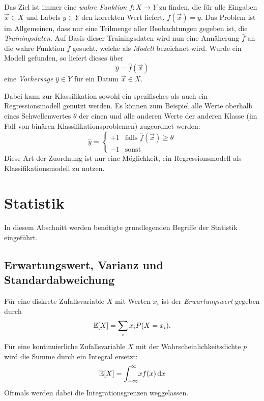 		Das Ziel ist immer eine \emph{wahre Funktion} \( f : X \to Y \) zu finden, die für alle Eingaben \( \vec{x} \in X \) und Labels \( y \in Y \) den korrekten Wert liefert, \dh \( f(\vec{x}) = y \). Das Problem ist im Allgemeinen, dass nur eine Teilmenge aller Beobachtungen gegeben ist, die \emph{Trainingsdaten}. Auf Basis dieser Trainingsdaten wird nun eine Annäherung \( \hat{f} \) an die wahre Funktion \(f\) gesucht, welche als \emph{Modell} bezeichnet wird. Wurde ein Modell gefunden, so liefert dieses über
		\begin{equation}
			\hat{y} = \hat{f}(\vec{x})
		\end{equation}
		eine \emph{Vorhersage} \( \hat{y} \in Y \) für ein Datum \( \vec{x} \in X \).

		Dabei kann zur Klassifikation sowohl ein spezifisches als auch ein Regressionsmodell genutzt werden. Es können zum Beispiel alle Werte oberhalb eines Schwellenwertes \(\theta\) der einen und alle anderen Werte der anderen Klasse (im Fall von binären Klassifikationsproblemen) zugeordnet werden:
		\begin{equation}
			\hat{y} =
				\begin{cases}
					+1 & \text{falls } \hat{f}(\vec{x}) \geq \theta \\
					-1 & \text{sonst}
				\end{cases}
		\end{equation}
		Diese Art der Zuordnung ist nur eine Möglichkeit, ein Regressionsmodell als Klassifikationsmodell zu nutzen.

	\section{Statistik}
		In diesem Abschnitt werden benötigte grundlegenden Begriffe der Statistik eingeführt.

		\subsection{Erwartungswert, Varianz und Standardabweichung}
			Für eine diskrete Zufallsvariable \(X\) mit Werten \( x_i \) ist der \emph{Erwartungswert} gegeben durch
			\begin{equation}
				\mathbb{E}[X] = \sum_i x_i P(X = x_i).
			\end{equation}
			Für eine kontinuierliche Zufallsvariable \(X\) mit der Wahrscheinlichkeitsdichte \(p\) wird die Summe durch ein Integral ersetzt:
			\begin{equation}
				\mathbb{E}[X] = \int_{-\infty}^{\infty} \! x f(x) \dd{x}
			\end{equation}
			Oftmals werden dabei die Integrationsgrenzen weggelassen.

